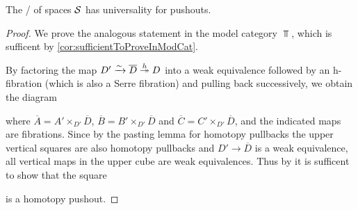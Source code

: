 \begin{prop} %
    The \inftycat/ of spaces $\mathcal{S}$ has universality for pushouts.
    \begin{proof}
        We prove the analogous statement in the model category $\Top$, which is sufficent by \cref{cor:sufficientToProveInModCat}.

        By factoring the map $D'\xrightarrow{\sim}\overline{D}\xtwoheadrightarrow{h} D$ into a weak equivalence followed by an h-fibration (which is also a Serre fibration) and pulling back successively, we obtain the diagram %
        \begin{center}
        \end{center}
        where $\overline{A}=A'\times_{D'}\overline{D}$, $\overline{B}=B'\times_{D'}\overline{D}$ and $\overline{C}=C'\times_{D'}\overline{D}$, and the indicated maps are fibrations.
        Since by the pasting lemma for homotopy pullbacks the upper vertical squares are also homotopy pullbacks and $D'\to\overline{D}$ is a weak equivalence, all vertical maps in the upper cube are weak equivalences.
        Thus by %
        it is sufficent to show that the square
        \begin{center}
        \end{center}
        is a homotopy pushout.


\end{proof}
\end{prop}
